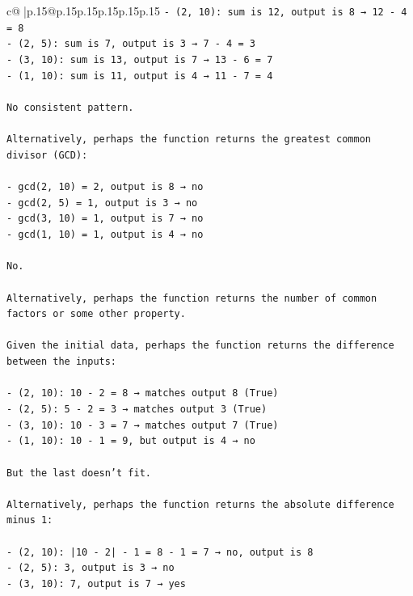 \documentclass{article}
\begin{document}
{\begin{supertabular}{c@{$\;$}|p{.15\linewidth}@{}p{.15\linewidth}p{.15\linewidth}p{.15\linewidth}p{.15\linewidth}p{.15\linewidth}}
{{{\texttt{{-} (2, 10): sum is 12, output is 8 → 12 {-} 4 = 8} \\
\texttt{{-} (2, 5): sum is 7, output is 3 → 7 {-} 4 = 3} \\
\texttt{{-} (3, 10): sum is 13, output is 7 → 13 {-} 6 = 7} \\
\texttt{{-} (1, 10): sum is 11, output is 4 → 11 {-} 7 = 4} \\
\\ 
\texttt{No consistent pattern.} \\
\\ 
\texttt{Alternatively, perhaps the function returns the greatest common divisor (GCD):} \\
\\ 
\texttt{{-} gcd(2, 10) = 2, output is 8 → no} \\
\texttt{{-} gcd(2, 5) = 1, output is 3 → no} \\
\texttt{{-} gcd(3, 10) = 1, output is 7 → no} \\
\texttt{{-} gcd(1, 10) = 1, output is 4 → no} \\
\\ 
\texttt{No.} \\
\\ 
\texttt{Alternatively, perhaps the function returns the number of common factors or some other property.} \\
\\ 
\texttt{Given the initial data, perhaps the function returns the difference between the inputs:} \\
\\ 
\texttt{{-} (2, 10): 10 {-} 2 = 8 → matches output 8 (True)} \\
\texttt{{-} (2, 5): 5 {-} 2 = 3 → matches output 3 (True)} \\
\texttt{{-} (3, 10): 10 {-} 3 = 7 → matches output 7 (True)} \\
\texttt{{-} (1, 10): 10 {-} 1 = 9, but output is 4 → no} \\
\\ 
\texttt{But the last doesn't fit.} \\
\\ 
\texttt{Alternatively, perhaps the function returns the absolute difference minus 1:} \\
\\ 
\texttt{{-} (2, 10): |10 {-} 2| {-} 1 = 8 {-} 1 = 7 → no, output is 8} \\
\texttt{{-} (2, 5): 3, output is 3 → no} \\
\texttt{{-} (3, 10): 7, output is 7 → yes} \\
}}}
\end{supertabular}}
\end{document}
